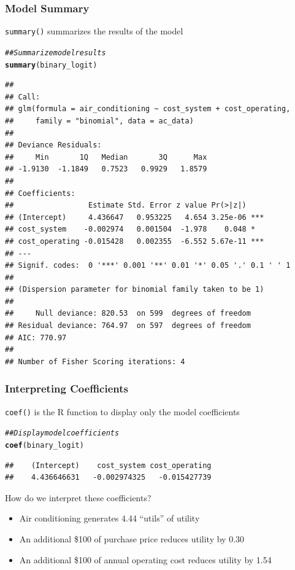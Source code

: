 \documentclass{beamer}\usepackage[]{graphicx}\usepackage[]{color}
\makeatletter
\newcommand{\hlcom}[1]{\textcolor[rgb]{0.678,0.584,0.686}{\textit{#1}}}%
\newcommand{\hlstd}[1]{\textcolor[rgb]{0.345,0.345,0.345}{#1}}%
\newcommand{\hlkwd}[1]{\textcolor[rgb]{0.737,0.353,0.396}{\textbf{#1}}}%
\newenvironment{kframe}{%
 \def\at@end@of@kframe{}%
 \ifinner\ifhmode%
  \def\at@end@of@kframe{\end{minipage}}%
  \begin{minipage}{\columnwidth}%
 \fi\fi%
 \def\FrameCommand##1{\hskip\@totalleftmargin \hskip-\fboxsep
 \colorbox{shadecolor}{##1}\hskip-\fboxsep
     \hskip-\linewidth \hskip-\@totalleftmargin \hskip\columnwidth}%
 \MakeFramed {\advance\hsize-\width
   \@totalleftmargin\z@ \linewidth\hsize
   \@setminipage}}%
 {\par\unskip\endMakeFramed%
 \at@end@of@kframe}
\newenvironment{knitrout}{}{} %
\makeatother
\begin{document}
\begin{frame}[fragile]\frametitle{Model Summary}
    \texttt{summary()} summarizes the results of the model
    \vspace{1ex}
\begin{knitrout}\tiny
{}\color{fgcolor}\begin{kframe}
\begin{alltt}
\hlcom{## Summarize model results}
\hlkwd{summary}\hlstd{(binary_logit)}
\end{alltt}
\begin{verbatim}
## 
## Call:
## glm(formula = air_conditioning ~ cost_system + cost_operating, 
##     family = "binomial", data = ac_data)
## 
## Deviance Residuals: 
##     Min       1Q   Median       3Q      Max  
## -1.9130  -1.1849   0.7523   0.9929   1.8579  
## 
## Coefficients:
##                 Estimate Std. Error z value Pr(>|z|)    
## (Intercept)     4.436647   0.953225   4.654 3.25e-06 ***
## cost_system    -0.002974   0.001504  -1.978    0.048 *  
## cost_operating -0.015428   0.002355  -6.552 5.67e-11 ***
## ---
## Signif. codes:  0 '***' 0.001 '**' 0.01 '*' 0.05 '.' 0.1 ' ' 1
## 
## (Dispersion parameter for binomial family taken to be 1)
## 
##     Null deviance: 820.53  on 599  degrees of freedom
## Residual deviance: 764.97  on 597  degrees of freedom
## AIC: 770.97
## 
## Number of Fisher Scoring iterations: 4
\end{verbatim}
\end{kframe}
\end{knitrout}
\end{frame}

\begin{frame}[fragile]\frametitle{Interpreting Coefficients}
    \texttt{coef()} is the R function to display only the model coefficients
\begin{knitrout}\footnotesize
{}\color{fgcolor}\begin{kframe}
\begin{alltt}
\hlcom{## Display model coefficients}
\hlkwd{coef}\hlstd{(binary_logit)}
\end{alltt}
\begin{verbatim}
##    (Intercept)    cost_system cost_operating 
##    4.436646631   -0.002974325   -0.015427739
\end{verbatim}
\end{kframe}
\end{knitrout}
    \vspace{2ex}
    How do we interpret these coefficients?
    \begin{itemize}
        \item Air conditioning generates 4.44 ``utils'' of utility
        \item An additional \$100 of purchase price reduces utility by 0.30
        \item An additional \$100 of annual operating cost reduces utility by 1.54
    \end{itemize}
\end{frame}
\end{document}
